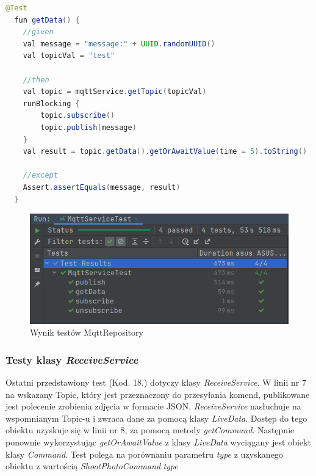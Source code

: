\begin{lstlisting}[language=Java, caption=Test pobierania danych za pomocą \textit{MqttService}]
  @Test
  fun getData() {
    //given
    val message = "message:" + UUID.randomUUID()
    val topicVal = "test"

    //then
    val topic = mqttService.getTopic(topicVal)
    runBlocking {
        topic.subscribe()
        topic.publish(message)
    }
    val result = topic.getData().getOrAwaitValue(time = 5).toString()

    //except
    Assert.assertEquals(message, result)
  }
\end{lstlisting}

\begin{figure}[!ht]
  \begin{center}
  \includegraphics[width=12cm]{./Obrazy/MqttTestResult.png}
  \caption{Wynik testów MqttRepository}
\end{center}
  \end{figure}



\subsubsection{Testy klasy \textit{ReceiveService}}

Ostatni przedstawiony test (Kod. 18.) dotyczy klasy \textit{ReceiveService}. W linii nr 7 na wskazany Topic, który jest przeznaczony do przesyłania komend, publikowane jest polecenie zrobienia zdjęcia w formacie JSON. \textit{ReceiveService} nasłuchuje na wspomnianym Topic-u i zwraca dane za pomocą klasy \textit{LiveData}. Dostęp do tego obiektu uzyskuje się w linii nr 8, za pomocą metody \textit{getCommand}. Następnie ponownie wykorzystując \textit{getOrAwaitValue} z klasy \textit{LiveData} wyciągany jest obiekt klasy \textit{Command}. Test polega na porównaniu parametru \textit{type} z uzyskanego obiektu z wartością \textit{ShootPhotoCommand.type}

